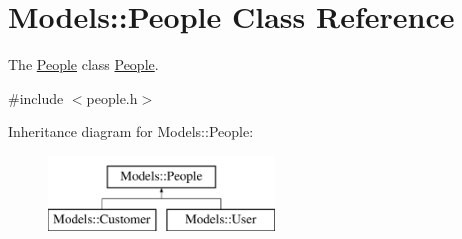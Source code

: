 \hypertarget{classModels_1_1People}{\section{Models\-:\-:People Class Reference}
\label{classModels_1_1People}
}


The \hyperlink{classModels_1_1People}{People} class \hyperlink{classModels_1_1People}{People}.  




{\ttfamily \#include $<$people.\-h$>$}

Inheritance diagram for Models\-:\-:People\-:\begin{figure}[H]
\begin{center}
\leavevmode
\includegraphics[height=2.000000cm]{de/d0a/classModels_1_1People}
\end{center}
\end{figure}
